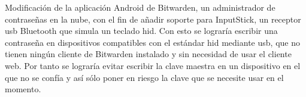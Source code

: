 Modificación de la aplicación Android de Bitwarden, un administrador de contraseñas en la nube, con el fin de añadir soporte para InputStick, un receptor \gls{usb} Bluetooth que simula un teclado \gls{hid}. Con esto se lograría escribir una contraseña en dispositivos compatibles con el estándar \gls{hid} mediante \gls{usb}, que no tienen ningún cliente de Bitwarden instalado y sin necesidad de usar el cliente web. Por tanto se lograría evitar escribir la clave maestra en un dispositivo en el que no se confía y así sólo poner en riesgo la clave que se necesite usar en el momento. 